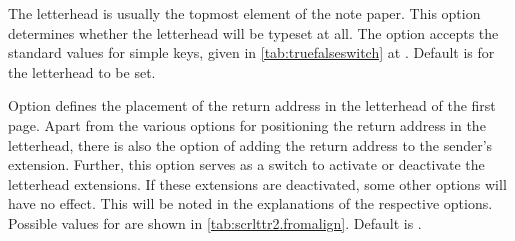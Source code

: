 \begin{Declaration}
\end{Declaration}
%
The letterhead is usually the topmost
element of the note paper.  This option determines whether the letterhead will
be typeset at all. The option accepts the standard values for simple keys,
given in \autoref{tab:truefalseswitch} at
. Default is for the letterhead to be set.%
%
%

\begin{Declaration}
\end{Declaration}
%
%
%
Option  defines the placement
of the return address in the letterhead of the first page. Apart from the
various options for positioning the return address in the letterhead, there is
also the option of adding the return
address to the sender's extension. Further, this option serves as a switch to
activate or deactivate the letterhead extensions. If these extensions are
deactivated, some other options will have no effect. This will be noted in the
explanations of the respective options. Possible values for 
are shown in \autoref{tab:scrlttr2.fromalign}. Default is .%
%
